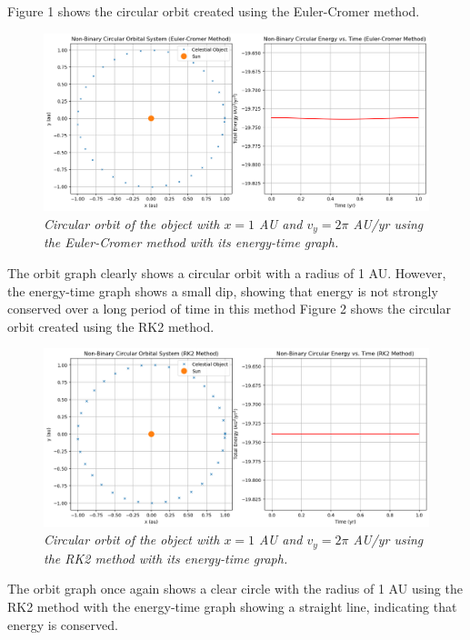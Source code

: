 \documentclass[11 pt, a4paper]{article}
\begin{document}
Figure 1 shows the circular orbit created using the Euler-Cromer method.
\begin{figure}[H]
  \includegraphics[width=1\linewidth]{Euler cromer/eulercromercircular.png}
  \centering
  \caption{\textit{Circular orbit of the object with $x = 1$ AU and $v_y = 2\pi$ AU/yr using the Euler-Cromer method with its energy-time graph.}} 
\end{figure}
The orbit graph clearly shows a circular orbit with a radius of 1 AU. However, the energy-time graph shows a small dip, showing that energy is not strongly conserved over a long period of time in this method
Figure 2 shows the circular orbit created using the RK2 method.
\begin{figure}[H] 
  \includegraphics[width=1\linewidth]{RK2/rk2circular.png}
  \centering
  \caption{\textit{Circular orbit of the object with $x = 1$ AU and $v_y = 2\pi$ AU/yr using the RK2 method with its energy-time graph.}}
\end{figure}
The orbit graph once again shows a clear circle with the radius of 1 AU using the RK2 method with the energy-time graph showing a straight line, indicating that energy is conserved.
\end{document}
